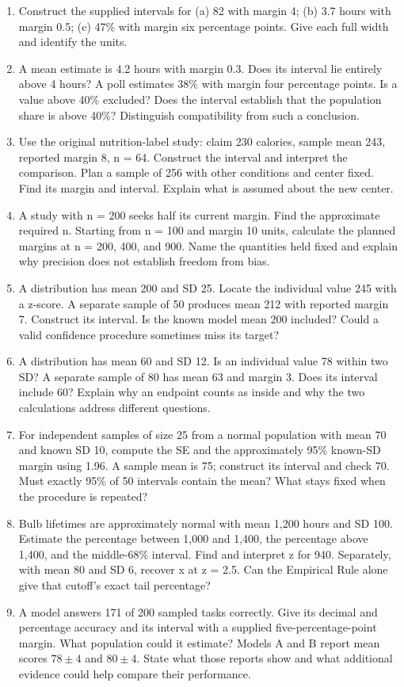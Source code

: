 \documentclass[11pt,letterpaper]{article}
\begin{document}
\begin{enumerate}
\item Construct the supplied intervals for (a) 82 with margin 4; (b) 3.7 hours with margin 0.5; (c) 47\% with margin six percentage points. Give each full width and identify the units.
\newpage
\item A mean estimate is 4.2 hours with margin 0.3. Does its interval lie entirely above 4 hours? A poll estimates 38\% with margin four percentage points. Is a value above 40\% excluded? Does the interval establish that the population share is above 40\%? Distinguish compatibility from such a conclusion.
\item Use the original nutrition-label study: claim 230 calories, sample mean 243, reported margin 8, n = 64. Construct the interval and interpret the comparison. Plan a sample of 256 with other conditions and center fixed. Find its margin and interval. Explain what is assumed about the new center.
\item A study with n = 200 seeks half its current margin. Find the approximate required n. Starting from n = 100 and margin 10 units, calculate the planned margins at n = 200, 400, and 900. Name the quantities held fixed and explain why precision does not establish freedom from bias.
\item A distribution has mean 200 and SD 25. Locate the individual value 245 with a z-score. A separate sample of 50 produces mean 212 with reported margin 7. Construct its interval. Is the known model mean 200 included? Could a valid confidence procedure sometimes miss its target?
\item A distribution has mean 60 and SD 12. Is an individual value 78 within two SD? A separate sample of 80 has mean 63 and margin 3. Does its interval include 60? Explain why an endpoint counts as inside and why the two calculations address different questions.
\item For independent samples of size 25 from a normal population with mean 70 and known SD 10, compute the SE and the approximately 95\% known-SD margin using 1.96. A sample mean is 75; construct its interval and check 70. Must exactly 95\% of 50 intervals contain the mean? What stays fixed when the procedure is repeated?
\item Bulb lifetimes are approximately normal with mean 1,200 hours and SD 100. Estimate the percentage between 1,000 and 1,400, the percentage above 1,400, and the middle-68\% interval. Find and interpret z for 940. Separately, with mean 80 and SD 6, recover x at z = 2.5. Can the Empirical Rule alone give that cutoff's exact tail percentage?
\item A model answers 171 of 200 sampled tasks correctly. Give its decimal and percentage accuracy and its interval with a supplied five-percentage-point margin. What population could it estimate? Models A and B report mean scores $78\pm4$ and $80\pm4$. State what those reports show and what additional evidence could help compare their performance.
\end{enumerate}
\end{document}
